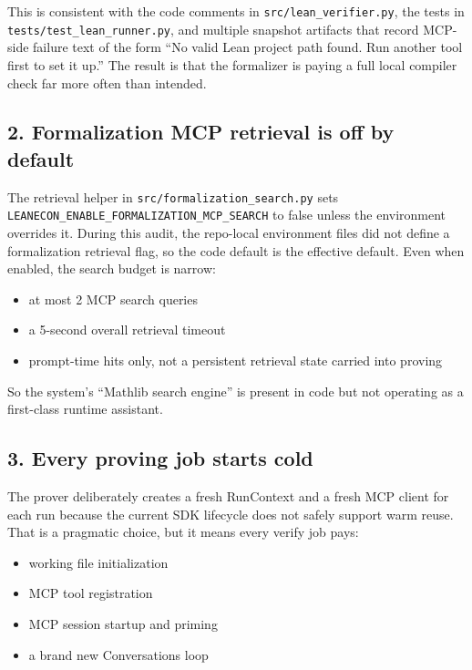 \documentclass[11pt]{article}
\begin{document}
This is consistent with the code comments in \texttt{src/lean\_verifier.py},
the tests in \texttt{tests/test\_lean\_runner.py}, and multiple snapshot
artifacts that record MCP-side failure text of the form ``No valid Lean project
path found. Run another tool first to set it up.'' The result is that the
formalizer is paying a full local compiler check far more often than intended.

\subsection*{2. Formalization MCP retrieval is off by default}

The retrieval helper in \texttt{src/formalization\_search.py} sets
\texttt{LEANECON\_ENABLE\_FORMALIZATION\_MCP\_SEARCH} to false unless the
environment overrides it. During this audit, the repo-local environment files
did not define a formalization retrieval flag, so the code default is the
effective default. Even when enabled, the search budget is narrow:

\begin{itemize}[leftmargin=1.5em]
  \item at most 2 MCP search queries
  \item a 5-second overall retrieval timeout
  \item prompt-time hits only, not a persistent retrieval state carried into proving
\end{itemize}

So the system's ``Mathlib search engine'' is present in code but not operating
as a first-class runtime assistant.

\subsection*{3. Every proving job starts cold}

The prover deliberately creates a fresh RunContext and a fresh MCP client for
each run because the current SDK lifecycle does not safely support warm reuse.
That is a pragmatic choice, but it means every verify job pays:

\begin{itemize}[leftmargin=1.5em]
  \item working file initialization
  \item MCP tool registration
  \item MCP session startup and priming
  \item a brand new Conversations loop
\end{itemize}
\end{document}
